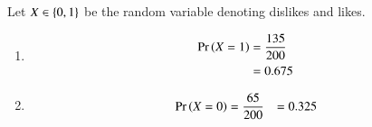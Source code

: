 Let $X \in \left\{0,1\right\}$ be the random variable denoting dislikes and likes.
\begin{enumerate}
\item 
\begin{align}
\Pr\left(X = 1\right) &= \frac{135}{200}
\\
&= 0.675
\end{align}
\item 
%
\begin{align}
\Pr\left(X = 0\right) &= \frac{65}{200}
&= 0.325
\end{align}
\end{enumerate}
